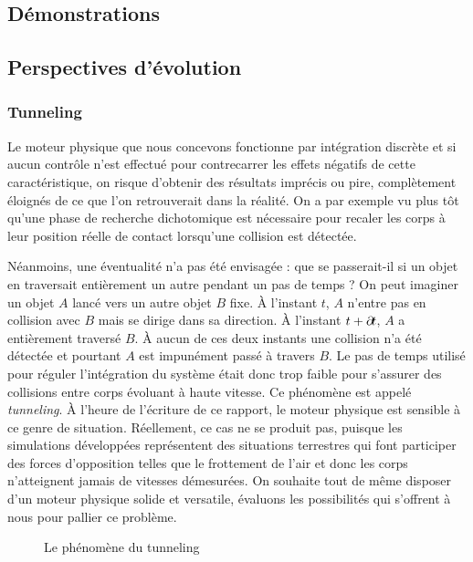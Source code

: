 \subsection{Démonstrations}



\subsection{Perspectives d'évolution}

\subsubsection{Tunneling}

Le moteur physique que nous concevons fonctionne par intégration
discrète et si aucun contrôle n'est effectué pour contrecarrer les
effets négatifs de cette caractéristique, on risque d'obtenir des
résultats imprécis ou pire, complètement éloignés de ce que l'on
retrouverait dans la réalité. On a par exemple vu plus tôt qu'une
phase de recherche dichotomique est nécessaire pour recaler les corps
à leur position réelle de contact lorsqu'une collision est détectée.

Néanmoins, une éventualité n'a pas été envisagée : que se passerait-il
si un objet en traversait entièrement un autre pendant un pas de temps
? On peut imaginer un objet $A$ lancé vers un autre objet $B$
fixe. \`A l'instant $t$, $A$ n'entre pas en collision avec $B$ mais se
dirige dans sa direction. \`A l'instant $t + \partial \! t$, $A$ a
entièrement traversé $B$. \`A aucun de ces deux instants une collision
n'a été détectée et pourtant $A$ est impunément passé à travers
$B$. Le pas de temps utilisé pour réguler l'intégration du système
était donc trop faible pour s'assurer des collisions entre corps
évoluant à haute vitesse. Ce phénomène est appelé
\textit{tunneling}. \`A l'heure de l'écriture de ce rapport, le moteur
physique est sensible à ce genre de situation. Réellement, ce cas ne
se produit pas, puisque les simulations développées représentent des
situations terrestres qui font participer des forces d'opposition
telles que le frottement de l'air et donc les corps n'atteignent
jamais de vitesses démesurées. On souhaite tout de même disposer d'un
moteur physique solide et versatile, évaluons les possibilités qui
s'offrent à nous pour pallier ce problème.

\begin{figure}
  \centering
  
  \caption{Le phénomène du tunneling}
  \label{tunneling1}
\end{figure}

